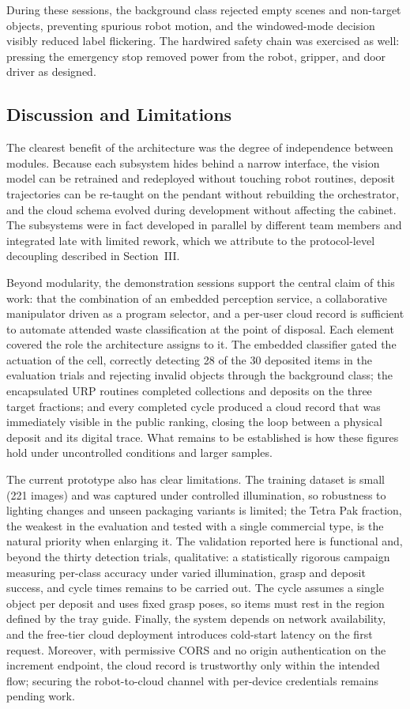\documentclass[conference]{IEEEtran}
\begin{document}
During these sessions, the background class rejected empty scenes and non-target objects, preventing spurious robot motion, and the windowed-mode decision visibly reduced label flickering. The hardwired safety chain was exercised as well: pressing the emergency stop removed power from the robot, gripper, and door driver as designed.

\subsection{Discussion and Limitations}
The clearest benefit of the architecture was the degree of independence between modules. Because each subsystem hides behind a narrow interface, the vision model can be retrained and redeployed without touching robot routines, deposit trajectories can be re-taught on the pendant without rebuilding the orchestrator, and the cloud schema evolved during development without affecting the cabinet. The subsystems were in fact developed in parallel by different team members and integrated late with limited rework, which we attribute to the protocol-level decoupling described in Section~III.

Beyond modularity, the demonstration sessions support the central claim of this work: that the combination of an embedded perception service, a collaborative manipulator driven as a program selector, and a per-user cloud record is sufficient to automate attended waste classification at the point of disposal. Each element covered the role the architecture assigns to it. The embedded classifier gated the actuation of the cell, correctly detecting 28 of the 30 deposited items in the evaluation trials and rejecting invalid objects through the background class; the encapsulated URP routines completed collections and deposits on the three target fractions; and every completed cycle produced a cloud record that was immediately visible in the public ranking, closing the loop between a physical deposit and its digital trace. What remains to be established is how these figures hold under uncontrolled conditions and larger samples.

The current prototype also has clear limitations. The training dataset is small (221 images) and was captured under controlled illumination, so robustness to lighting changes and unseen packaging variants is limited; the Tetra Pak fraction, the weakest in the evaluation and tested with a single commercial type, is the natural priority when enlarging it. The validation reported here is functional and, beyond the thirty detection trials, qualitative: a statistically rigorous campaign measuring per-class accuracy under varied illumination, grasp and deposit success, and cycle times remains to be carried out. The cycle assumes a single object per deposit and uses fixed grasp poses, so items must rest in the region defined by the tray guide. Finally, the system depends on network availability, and the free-tier cloud deployment introduces cold-start latency on the first request. Moreover, with permissive CORS and no origin authentication on the increment endpoint, the cloud record is trustworthy only within the intended flow; securing the robot-to-cloud channel with per-device credentials remains pending work.
\end{document}
